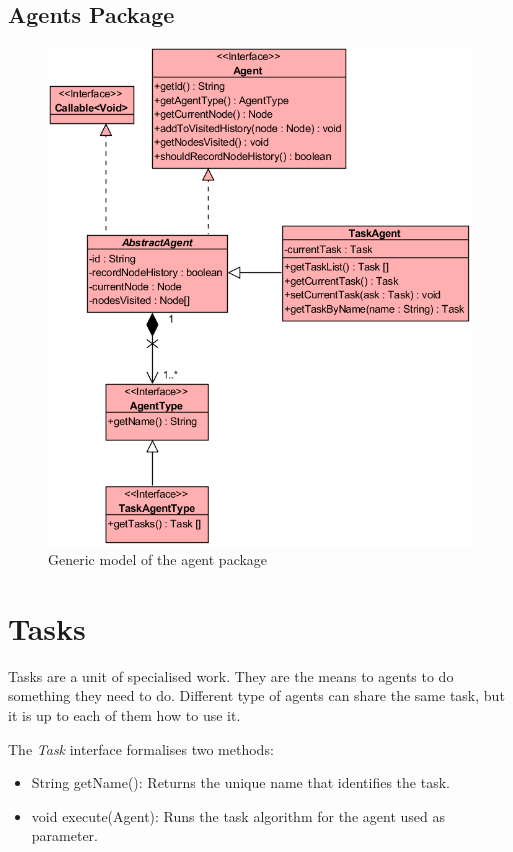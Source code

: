 \subsection{Agents Package}

\begin{figure}[H]
  \centering
  \includegraphics[width=1.0\linewidth]{gfx/uml-agent-package.png}
  \caption{Generic model of the agent package}
  \label{fig:gen-agent-package}
\end{figure}


\section {Tasks}

Tasks are a unit of specialised work. They are the means to agents to do something they need to do. Different type of agents can share the same task, but it is up to each of them how to use it.

The \emph{Task} interface formalises two methods:

\begin{itemize}
  \item String getName(): Returns the unique name that identifies the task.
  
  \item void execute(Agent): Runs the task algorithm for the agent used as parameter.
\end{itemize}

